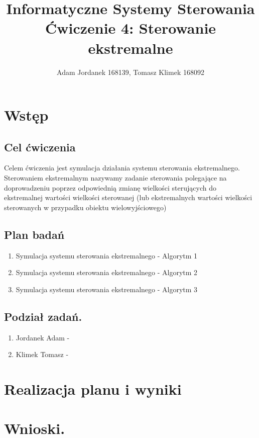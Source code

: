 \documentclass[a4paper,10pt]{article}
\title{Informatyczne Systemy Sterowania \\ \large Ćwiczenie 4: Sterowanie ekstremalne}
\author{Adam Jordanek 168139, Tomasz Klimek 168092}
\begin{document}
\maketitle

\section{Wstęp}\label{sec:wstęp}
\subsection{Cel ćwiczenia}
Celem  ćwiczenia jest symulacja działania systemu sterowania ekstremalnego. Sterowaniem 
ekstremalnym nazywamy zadanie sterowania polegające na doprowadzeniu poprzez odpowiednią
zmianę wielkości sterujących do ekstremalnej wartości wielkości sterowanej (lub ekstremalnych 
wartości wielkości sterowanych w przypadku obiektu wielowyjściowego)
\subsection{Plan badań} 
\begin{enumerate}
	\item Symulacja systemu sterowania ekstremalnego - Algorytm 1
	
	\item Symulacja systemu sterowania ekstremalnego - Algorytm 2
	
	\item Symulacja systemu sterowania ekstremalnego - Algorytm 3
	
\end{enumerate}

\subsection{Podział zadań. } 
\begin{enumerate}
		\item Jordanek Adam - 
		\item Klimek Tomasz -
\end{enumerate}

\newpage
\section{Realizacja planu i wyniki}

\section{Wnioski.}\label{sec:wnioski}
\end{document}
